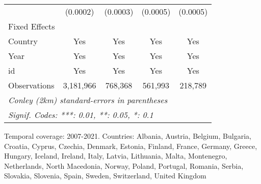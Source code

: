 \begin{table}[htbp]
\begin{tabular}{lcccc}
                            & (0.0002)             & (0.0003)      & (0.0005)                           & (0.0005)\\   
      Fixed Effects\\
      Country               & Yes                  & Yes           & Yes                                & Yes\\  
      Year                  & Yes                  & Yes           & Yes                                & Yes\\  
      id                    & Yes                  & Yes           & Yes                                & Yes\\  
      \midrule 
      Observations          & 3,181,966            & 768,368       & 561,993                            & 218,789\\  
      \midrule \midrule
      \multicolumn{5}{l}{\emph{Conley (2km) standard-errors in parentheses}}\\
      \multicolumn{5}{l}{\emph{Signif. Codes: ***: 0.01, **: 0.05, *: 0.1}}\\
   \end{tabular}
   
   \par \raggedright 
   Temporal coverage: 2007-2021. Countries: Albania, Austria, Belgium, Bulgaria, Croatia, Cyprus, Czechia, Denmark, Estonia, Finland, France, Germany, Greece, Hungary, Iceland, Ireland, Italy, Latvia, Lithuania, Malta, Montenegro, Netherlands, North Macedonia, Norway, Poland, Portugal, Romania, Serbia, Slovakia, Slovenia, Spain, Sweden, Switzerland, United Kingdom
\end{table}


